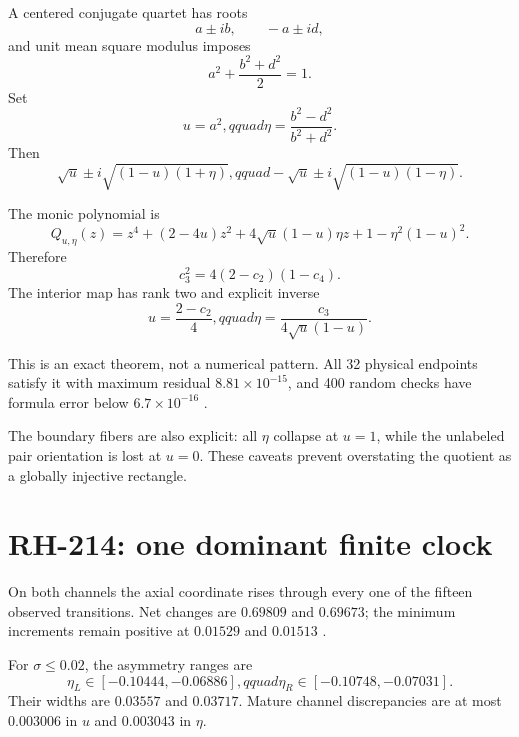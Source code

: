 \documentclass[12pt]{article}
\theoremstyle{remark}\newtheorem{remark}[theorem]{Remark}
\begin{document}
A centered conjugate quartet has roots
\begin{equation}
 a\pm ib,\qquad -a\pm id,
\end{equation}
and unit mean square modulus imposes
\begin{equation}
 a^2+\frac{b^2+d^2}{2}=1.
\end{equation}
Set
\begin{equation}
 u=a^2,qquad \eta=\frac{b^2-d^2}{b^2+d^2}.
\end{equation}
Then
\begin{equation}\label{eq:canonicalroots}
 \sqrt u\pm i\sqrt{(1-u)(1+\eta)},qquad
 -\sqrt u\pm i\sqrt{(1-u)(1-\eta)}.
\end{equation}

The monic polynomial is
\begin{equation}\label{eq:shapeformula}
 Q_{u,\eta}(z)=z^4+(2-4u)z^2
 +4\sqrt u(1-u)\eta z+1-\eta^2(1-u)^2.
\end{equation}
Therefore
\begin{equation}\label{eq:identity}
 c_3^2=4(2-c_2)(1-c_4).
\end{equation}
The interior map has rank two and explicit inverse
\begin{equation}
 u=\frac{2-c_2}{4},qquad
 \eta=\frac{c_3}{4\sqrt u(1-u)}.
\end{equation}

This is an exact theorem, not a numerical pattern.  All 32 physical endpoints
satisfy it with maximum residual $8.81\times10^{-15}$, and 400 random checks
have formula error below $6.7\times10^{-16}$ \citep{WangRH213}.

The boundary fibers are also explicit: all $\eta$ collapse at $u=1$, while
the unlabeled pair orientation is lost at $u=0$.  These caveats prevent
overstating the quotient as a globally injective rectangle.

\section{RH-214: one dominant finite clock}

On both channels the axial coordinate rises through every one of the fifteen
observed transitions.  Net changes are $0.69809$ and $0.69673$; the minimum
increments remain positive at $0.01529$ and $0.01513$
\citep{WangRH214}.

For $\sigma\le0.02$, the asymmetry ranges are
\begin{equation}
 \eta_L\in[-0.10444,-0.06886],qquad
 \eta_R\in[-0.10748,-0.07031].
\end{equation}
Their widths are $0.03557$ and $0.03717$.  Mature channel discrepancies are
at most $0.003006$ in $u$ and $0.003043$ in $\eta$.
\end{document}

